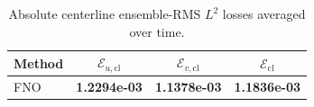 \begin{table}[t]
\centering
\caption{Absolute centerline ensemble-RMS $L^2$ losses averaged over time.}
\label{tab:centerline_abs_ensemble_rms_l2_loss}
\begin{tabular}{lccc}
\toprule
Method & $\mathcal{E}_{u,\mathrm{cl}}$ & $\mathcal{E}_{v,\mathrm{cl}}$ & $\mathcal{E}_{\mathrm{cl}}$ \\
\midrule
FNO & \textbf{1.2294e-03} & \textbf{1.1378e-03} & \textbf{1.1836e-03} \\
\bottomrule
\end{tabular}
\end{table}